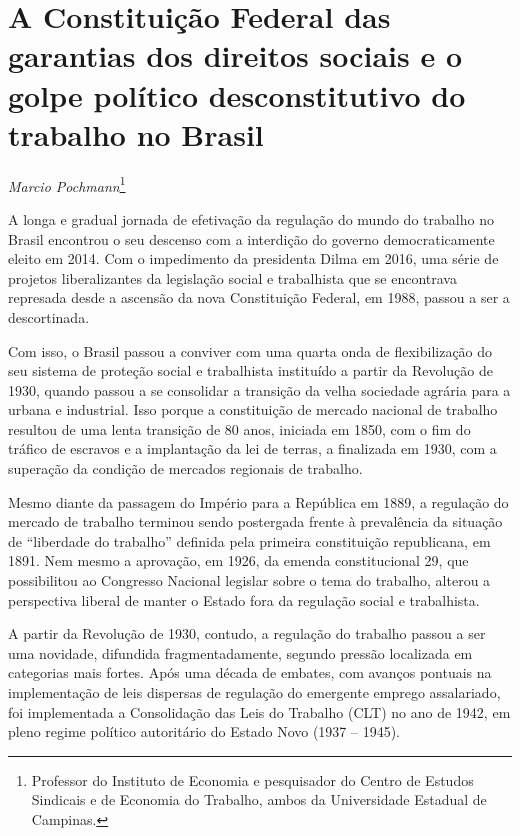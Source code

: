 \chapter{A Constituição Federal das garantias dos direitos sociais e o
golpe político desconstitutivo do trabalho no Brasil}

\begin{flushright}
\emph{Marcio Pochmann}\footnote{Professor do Instituto de Economia e
  pesquisador do Centro de Estudos Sindicais e de Economia do Trabalho,
  ambos da Universidade Estadual de Campinas.}
\end{flushright}

A longa e gradual jornada de efetivação da regulação do mundo do
trabalho no Brasil encontrou o seu descenso com a interdição do governo
democraticamente eleito em 2014. Com o impedimento da presidenta Dilma
em 2016, uma série de projetos liberalizantes da legislação social e
trabalhista que se encontrava represada desde a ascensão da nova
Constituição Federal, em 1988, passou a ser a descortinada.

Com isso, o Brasil passou a conviver com uma quarta onda de
flexibilização do seu sistema de proteção social e trabalhista
instituído a partir da Revolução de 1930, quando passou a se consolidar
a transição da velha sociedade agrária para a urbana e industrial. Isso
porque a constituição de mercado nacional de trabalho resultou de uma
lenta transição de 80 anos, iniciada em 1850, com o fim do tráfico de
escravos e a implantação da lei de terras, a finalizada em 1930, com a
superação da condição de mercados regionais de trabalho.

Mesmo diante da passagem do Império para a República em 1889, a
regulação do mercado de trabalho terminou sendo postergada frente à
prevalência da situação de ``liberdade do trabalho'' definida pela
primeira constituição republicana, em 1891. Nem mesmo a aprovação, em
1926, da emenda constitucional 29, que possibilitou ao Congresso
Nacional legislar sobre o tema do trabalho, alterou a perspectiva
liberal de manter o Estado fora da regulação social e trabalhista.

A partir da Revolução de 1930, contudo, a regulação do trabalho passou a
ser uma novidade, difundida fragmentadamente, segundo pressão localizada
em categorias mais fortes. Após uma década de embates, com avanços
pontuais na implementação de leis dispersas de regulação do emergente
emprego assalariado, foi implementada a Consolidação das Leis do
Trabalho (CLT) no ano de 1942, em pleno regime político autoritário do
Estado Novo (1937 -- 1945).

